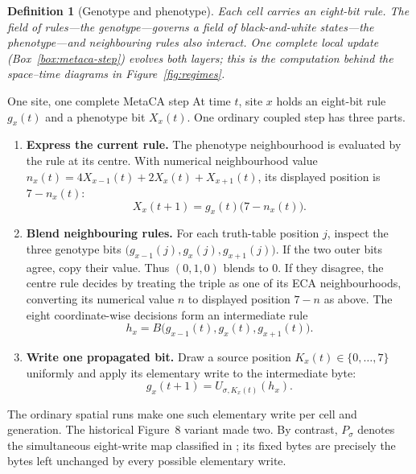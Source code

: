 \documentclass[man,12pt,floatsintext,donotrepeattitle]{apa7}
\newcommand{\sig}{\sigma}
\newcommand{\secref}[1]{\emph{\nameref{#1}}}
\newtheorem{definition}{Definition}
\begin{document}
\begin{definition}[Genotype and phenotype]\label{def:genopheno}
Each cell carries an eight-bit rule. The field of rules---the
\emph{genotype}---governs a field of black-and-white states---the
\emph{phenotype}---and neighbouring rules also interact. One complete local
update (Box~\ref{box:metaca-step}) evolves both layers; this is the computation
behind the space--time diagrams in Figure~\ref{fig:regimes}.
\end{definition}

\Needspace{0.72\textheight}
\begin{workedexample}[label={box:metaca-step}]{One site, one complete MetaCA step}
\small
At time $t$, site $x$ holds an eight-bit rule $g_x(t)$ and a phenotype bit
$X_x(t)$. One ordinary coupled step has three parts.
\begin{enumerate}
\item \textbf{Express the current rule.} The phenotype neighbourhood is
evaluated by the rule at its centre. With numerical neighbourhood value
$n_x(t)=4X_{x-1}(t)+2X_x(t)+X_{x+1}(t)$, its displayed position is $7-n_x(t)$:
\[
X_x(t+1)=g_x(t)\bigl(7-n_x(t)\bigr).
\]
\item \textbf{Blend neighbouring rules.} For each truth-table position $j$,
inspect the three genotype bits
$\bigl(g_{x-1}(j),g_x(j),g_{x+1}(j)\bigr)$. If the two outer bits agree, copy
their value. Thus $(0,1,0)$ blends to $0$. If they disagree, the centre rule
decides by treating the triple as one of its ECA neighbourhoods, converting
its numerical value $n$ to displayed position $7-n$ as above. The eight
coordinate-wise decisions form an intermediate rule
\[
h_x=B\bigl(g_{x-1}(t),g_x(t),g_{x+1}(t)\bigr).
\]
\item \textbf{Write one propagated bit.} Draw a source position
$K_x(t)\in\{0,\ldots,7\}$ uniformly and apply its elementary write to the
intermediate byte:
\[
g_x(t+1)=U_{\sig,K_x(t)}(h_x).
\]
\end{enumerate}
The ordinary spatial runs make one such elementary write per cell and
generation. The historical Figure~8 variant made two. By contrast,
$P_\sig$ denotes the simultaneous eight-write map classified in
\secref{sec:classification}; its fixed bytes are precisely the bytes left
unchanged by every possible elementary write.
\end{workedexample}
\end{document}
